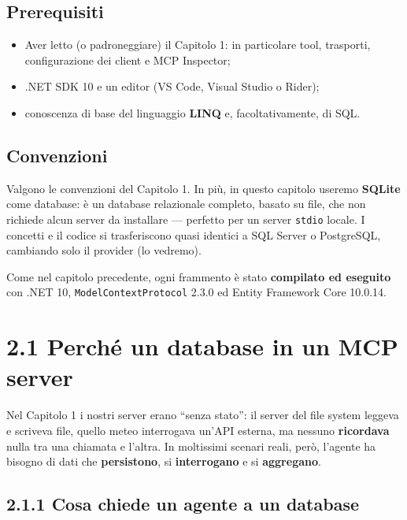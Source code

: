 \documentclass[
  italian,
  10pt,
]{book}
\providecommand{\tightlist}{%
  \setlength{\itemsep}{0pt}\setlength{\parskip}{0pt}}
\begin{document}
\subsection{Prerequisiti}\label{prerequisiti}

\begin{itemize}
\tightlist
\item
  Aver letto (o padroneggiare) il Capitolo 1: in particolare tool,
  trasporti, configurazione dei client e MCP Inspector;
\item
  .NET SDK 10 e un editor (VS Code, Visual Studio o Rider);
\item
  conoscenza di base del linguaggio \textbf{LINQ} e, facoltativamente,
  di SQL.
\end{itemize}

\subsection{Convenzioni}\label{convenzioni}

Valgono le convenzioni del Capitolo 1. In più, in questo capitolo
useremo \textbf{SQLite} come database: è un database relazionale
completo, basato su file, che non richiede alcun server da installare
--- perfetto per un server \texttt{stdio} locale. I concetti e il codice
si trasferiscono quasi identici a SQL Server o PostgreSQL, cambiando
solo il provider (lo vedremo).

Come nel capitolo precedente, ogni frammento è stato \textbf{compilato
ed eseguito} con .NET 10, \texttt{ModelContextProtocol} 2.3.0 ed Entity
Framework Core 10.0.14.

\section{2.1 Perché un database in un MCP
server}\label{perchuxe9-un-database-in-un-mcp-server}

Nel Capitolo 1 i nostri server erano ``senza stato'': il server del file
system leggeva e scriveva file, quello meteo interrogava un'API esterna,
ma nessuno \textbf{ricordava} nulla tra una chiamata e l'altra. In
moltissimi scenari reali, però, l'agente ha bisogno di dati che
\textbf{persistono}, si \textbf{interrogano} e si \textbf{aggregano}.

\subsection{2.1.1 Cosa chiede un agente a un
database}\label{cosa-chiede-un-agente-a-un-database}
\end{document}

